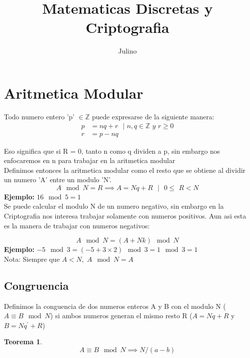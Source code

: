 \documentclass{article}
\title{Matematicas Discretas y Criptografia}
\author{Julino}
\begin{document}
\maketitle
\newtheorem{theorem}{Teorema}[section]

\renewcommand \qedsymbol{}
\renewcommand{\thefootnote}{\fnsymbol{footnote}}
\newcommand{\SP}{\,\,}

\pagebreak
\section{Aritmetica Modular}
Todo numero entero 'p' $\in \mathbb{Z}$ puede expresarse de la siguiente manera:
\begin{equation}
    \label{divisibilidad}
    \begin{split}
        p &= nq + r \SP\SP \vert \SP n,q \in \mathbb{Z} \SP y \SP r \geq 0\\
        r &= p - nq
    \end{split}
\end{equation}

Eso significa que si R = 0, tanto n como q dividen a p, sin embargo nos enfocaremos
en n para trabajar en la aritmetica modular\\

Definimos entonces la aritmetica modular como el resto que se obtiene al dividir un
numero 'A' entre un modulo 'N'.
$$A\mod{N} = R \implies A = Nq + R\SP\SP \vert \SP\SP 0 \le \SP  R < N$$
\textbf{Ejemplo:} $16 \mod{5} = 1$\\

Se puede calcular el modulo N de un numero negativo, sin embargo en la Criptografia
nos interesa trabajar solamente con numeros positivos. Aun asi esta es la manera de
trabajar con numeros negativos:

$$A\mod{N} = (A + Nk) \mod{N}$$
\textbf{Ejemplo:} $-5 \mod{3} = (-5 + 3\times2) \mod{3} = 1\mod{3} = 1$\\
Nota: Siempre que $A < N, \SP A \mod{N} = A$

\subsection{Congruencia} \label{congruencia}
Definimos la conguencia de dos numeros enteros A y B con el modulo N ($A \equiv B \mod N$) si ambos
numeros generan el mismo resto R ($A = Nq + R$ y $B = Nq^\prime + R$)

\begin{theorem}
    $$ A \equiv B \mod N \implies N / (a-b)$$
\end{theorem}
\end{document}
